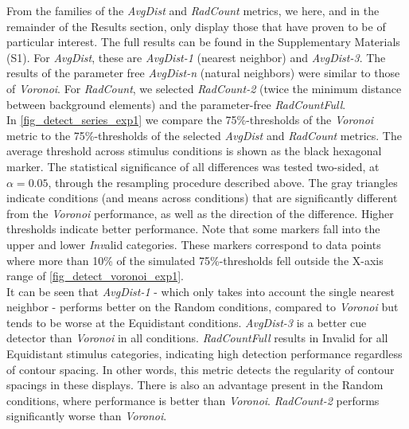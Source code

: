 \documentclass[12pt]{article}
\begin{document}
From the families of the \emph{AvgDist} and \emph{RadCount} metrics, we here, and in the remainder of the Results section, only display those that have proven to be of particular interest. The full results can be found in the Supplementary Materials (S1). For \emph{AvgDist}, these are \emph{AvgDist-1} (nearest neighbor) and \emph{AvgDist-3}. The results of the parameter free \emph{AvgDist-n} (natural neighbors) were similar to those of \emph{Voronoi}. For \emph{RadCount}, we selected \emph{RadCount-2} (twice the minimum distance between background elements) and the parameter-free \emph{RadCountFull}.\\

In \autoref{fig_detect_series_exp1} we compare the 75\%-thresholds of the \emph{Voronoi} metric to the 75\%-thresholds of the selected \emph{AvgDist} and \emph{RadCount} metrics. The average threshold across stimulus conditions is shown as the black hexagonal marker. The statistical significance of all differences was tested two-sided, at $\alpha = 0.05$, through the resampling procedure described above. The gray triangles indicate conditions (and means across conditions) that are significantly different from the \emph{Voronoi} performance, as well as the direction of the difference. Higher thresholds indicate better performance. Note that some markers fall into the upper and lower \emph{Inv}alid categories. These markers correspond to data points where more than 10\% of the simulated 75\%-thresholds fell outside the X-axis range of \autoref{fig_detect_voronoi_exp1}.\\

It can be seen that \emph{AvgDist-1} - which only takes into account the single nearest neighbor - performs better on the Random conditions, compared to \emph{Voronoi} but tends to be worse at the Equidistant conditions. \emph{AvgDist-3} is a better cue detector than \emph{Voronoi} in all conditions. \emph{RadCountFull} results in Invalid for all Equidistant stimulus categories, indicating high detection performance regardless of contour spacing. In other words, this metric detects the regularity of contour spacings in these displays. There is also an advantage present in the Random conditions, where performance is better than \emph{Voronoi}. \emph{RadCount-2} performs significantly worse than \emph{Voronoi}.
\end{document}
